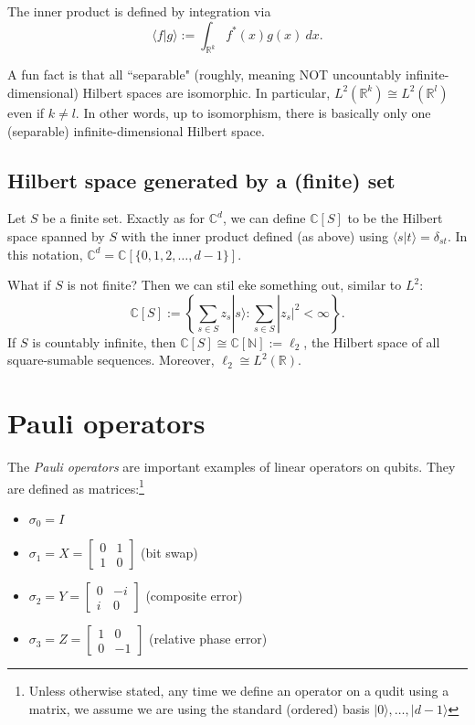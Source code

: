 \documentclass{article}
\newcommand{\ket}[1]{|#1\rangle}
\newcommand{\braket}[2]{\langle#1|#2\rangle}
\newcommand{\bbC}{\mathbb{C}}
\begin{document}
The inner product is defined by integration via
\[\braket{f}{g} := \int_{\mathbb{R}^k}f^*(x)g(x) \ dx.\]

A fun fact is that all ``separable" (roughly, meaning NOT uncountably infinite-dimensional) Hilbert spaces are isomorphic.  In particular, $L^2(\mathbb{R}^k) \cong L^2(\mathbb{R}^l)$ even if $k \ne l$.  In other words, up to isomorphism, there is basically only one (separable) infinite-dimensional Hilbert space.

\subsection{Hilbert space generated by a (finite) set}
Let $S$ be a finite set.  Exactly as for $\bbC^d$, we can define $\mathbb{C}[S]$ to be the Hilbert space spanned by $S$ with the inner product defined (as above) using $\braket{s}{t} = \delta_{st}$.  In this notation, $\bbC^d = \bbC[\{0,1,2,\dots,d-1\}]$.

What if $S$ is not finite?  Then we can stil eke something out, similar to $L^2$:
\[ \bbC[S] := \left\{ \sum_{s \in S} z_s \ket{s} : \sum_{s \in S} |z_s|^2 < \infty \right\}.\]
If $S$ is countably infinite, then $\mathbb{C}[S] \cong \mathbb{C}[\mathbb{N}] := \ell_2$, the Hilbert space of all square-sumable sequences.  Moreover, $\ell_2 \cong L^2(\mathbb{R})$.


\section{Pauli operators}
The {\em Pauli operators} are important examples of linear operators on qubits.
They are defined as matrices:\footnote{Unless otherwise stated, any time we define an operator on a qudit using a matrix, we assume we are using the standard (ordered) basis $\ket{0}, \dots, \ket{d - 1}$}
\begin{itemize}
    \item[] $\sigma_0 = I$
    \item[] $\sigma_1 = X = \begin{bmatrix}
        0 & 1\\1 & 0
    \end{bmatrix}$ (bit swap)
    \item[] $\sigma_2 = Y = \begin{bmatrix}
        0 & -i\\i & 0
    \end{bmatrix}$ (composite error)
    \item[] $\sigma_3 = Z = \begin{bmatrix}
        1 & 0\\0 & -1
    \end{bmatrix}$ (relative phase error)
\end{itemize}
\end{document}
